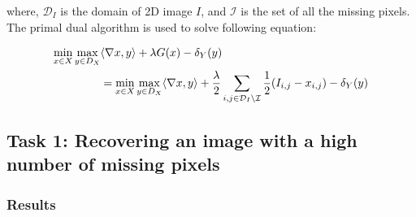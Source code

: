 \documentclass[paper=a4, fontsize=11pt]{scrartcl} %
\numberwithin{equation}{section} %
\numberwithin{figure}{section} %
\numberwithin{table}{section} %
\begin{document}
where, $\mathcal{D}_I$ is the domain of 2D image $I$, and $\mathcal{I}$ is the set of all the missing pixels. \\

The primal dual algorithm is used to solve following equation: 

\begin{align}
	\min_{x \in X} \max_{y \in D_X} & \langle \nabla x, y \rangle + \lambda G(x) - \delta_Y (y) \notag \\
	&= \min_{x \in X} \max_{y \in D_X} \langle \nabla x, y \rangle + \frac{\lambda}{2} \sum_{i, j \in \mathcal{D}_I \setminus \mathcal{I}} \frac{1}{2} (I_{i,j} - x_{i,j}) - \delta_Y (y)  
\end{align}



\subsection{Task 1: Recovering an image with a high number of missing pixels}

\subsubsection{Results}
\end{document}
